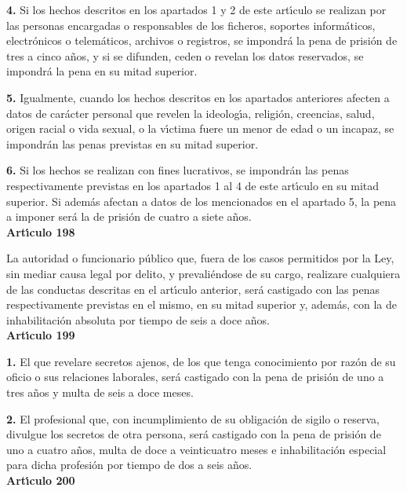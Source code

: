 {\bf 4.} Si los hechos descritos en los apartados 1 y 2 de este art\'{\i}culo 
se realizan por las personas encargadas o responsables de los ficheros, 
soportes inform\'aticos, electr\'onicos o telem\'aticos, archivos o registros, 
se impondr\'a la pena de prisi\'on de tres a cinco a\~nos, y si se difunden, 
ceden o revelan los datos reservados, se impondr\'a la pena en su mitad 
superior. 
 
{\bf 5.} Igualmente, cuando los hechos descritos en los apartados anteriores 
afecten a datos de car\'acter personal que revelen la ideolog\'{\i}a, 
religi\'on, creencias, salud, origen racial o vida sexual, o la v\'{\i}ctima 
fuere un menor de edad o un incapaz, se impondr\'an las penas previstas en su 
mitad superior. 
 
{\bf 6.} Si los hechos se realizan con fines lucrativos, se impondr\'an las 
penas respectivamente previstas en los apartados 1 al 4 de este art\'{\i}culo 
en su mitad superior. Si adem\'as afectan a datos de los mencionados en el 
apartado 5, la pena a imponer ser\'a la de prisi\'on de cuatro a siete a\~nos.
\vspace{0.3cm}\\
{\large {\bf Art\'{\i}culo 198}} 
 
La autoridad o funcionario p\'ublico que, fuera de los casos permitidos por 
la Ley, sin mediar causa legal por delito, y prevali\'endose de su cargo, 
realizare cualquiera de las conductas descritas en el art\'{\i}culo anterior, 
ser\'a castigado con las penas respectivamente previstas en el mismo, en su 
mitad superior y, adem\'as, con la de inhabilitaci\'on absoluta por tiempo de 
seis a doce a\~nos. 
\vspace{0.3cm}\\ 
{\large {\bf Art\'{\i}culo 199}}
 
{\bf 1.} El que revelare secretos ajenos, de los que tenga conocimiento por 
raz\'on de su oficio o sus relaciones laborales, ser\'a castigado con la pena 
de prisi\'on de uno a tres a\~nos y multa de seis a doce meses. 
 
{\bf 2.} El profesional que, con incumplimiento de su obligaci\'on de sigilo o 
reserva, divulgue los secretos de otra persona, ser\'a castigado con la pena de 
prisi\'on de uno a cuatro a\~nos, multa de doce a veinticuatro meses e 
inhabilitaci\'on especial para dicha profesi\'on por tiempo de dos a seis 
a\~nos. 
\vspace{0.3cm}\\ 
{\large {\bf Art\'{\i}culo 200}}
 
